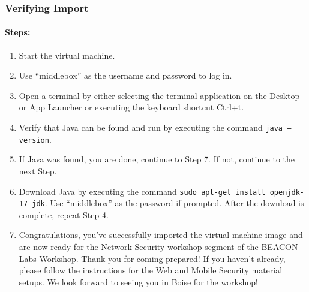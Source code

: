 \documentclass[letterpaper,12pt]{report}
\begin{document}
\subsubsection*{Verifying Import}

\paragraph*{Steps:}

\begin{enumerate}
    \item Start the virtual machine.
    \item Use ``middlebox'' as the username and password to log in.
    \item Open a terminal by either selecting the terminal application on the Desktop or App Launcher or executing the keyboard shortcut Ctrl+t.
    \item Verify that Java can be found and run by executing the command \texttt{java --version}.
    \item If Java was found, you are done, continue to Step 7. If not, continue to the next Step.
    \item Download Java by executing the command \texttt{sudo apt-get install openjdk-17-jdk}. Use ``middlebox'' as the password if prompted. After the download is complete, repeat Step 4.
    \item Congratulations, you've successfully imported the virtual machine image and are now ready for the Network Security workshop segment of the BEACON Labs Workshop. Thank you for coming prepared! If you haven't already, please follow the instructions for the Web and Mobile Security material setups. We look forward to seeing you in Boise for the workshop!
\end{enumerate}
\end{document}
